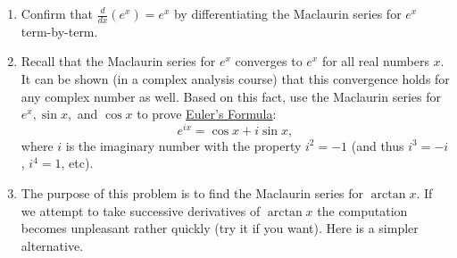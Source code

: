 \documentclass[12pt]{article}
\newif\ifans
\begin{document}
\begin{enumerate}

\item Confirm that $\frac{d}{dx}(e^x)=e^x$ by differentiating the Maclaurin series for $e^x$ term-by-term.

\ifans{\fbox{\parbox{1\linewidth}{\begin{align*} \frac{d}{dx}(e^x)&=\frac{d}{dx}\left[1+x+\frac{x^2}{2!}+\frac{x^3}{3!}+\frac{x^4}{4!}+\ldots \right] \\
&=0+1+\frac{2x}{2!}+\frac{3x^2}{3!}+\frac{4x^3}{4!}+\ldots \\
&=1+x+\frac{x^2}{2!}+\frac{x^3}{3!}+\ldots \\
&=e^x. \end{align*}  }}} \fi

\item Recall that the Maclaurin series for $e^{x}$ converges to $e^{x}$ for all real numbers $x$.  It can be shown (in a complex analysis course) that this convergence holds for any complex number as well.  Based on this fact, use the Maclaurin
series for $e^x, \sin{x},$ and $\cos{x}$ to prove \underline{Euler's Formula}: $$e^{ix}=\cos{x}+i\sin{x},$$ where $i$ is the imaginary number with the property $i^2=-1$ (and thus $i^3=-i$, $i^4=1$, etc).

\ifans{\fbox{\parbox{1\linewidth}{Since $e^x=1+x+\frac{x^2}{2!}+\frac{x^3}{3!}+\ldots$ \text{ }, we have 
\begin{align*}  e^{ix}&=1+ix+\frac{(ix)^2}{2!}+\frac{(ix)^3}{3!}+\frac{(ix)^4}{4!}+\frac{(ix)^5}{5!}+\frac{(ix)^6}{6!}+\frac{(ix)^7}{7!}+\frac{(ix)^8}{8!}+\ldots
\\ &=1+ix-\frac{x^2}{2!}-i\frac{x^3}{3!}+\frac{x^4}{4!}+i\frac{x^5}{5!}-\frac{x^6}{6!}-i\frac{x^7}{7!}+\frac{x^8}{8!}+\ldots 
\\ &=\left(1-\frac{x^2}{2!}+\frac{x^4}{4!}-\frac{x^6}{6!}+\frac{x^8}{8!}+\ldots\right)+i\left(x-\frac{x^3}{3!}+\frac{x^5}{5!}-\frac{x^7}{7!}+\ldots\right)
\\ &=\cos{x}+i\sin{x} \end{align*} 
Note: Recall that Euler's formula was useful when solving second order linear homogeneous differential equations with constant coefficients, specifcally for when the characteristic equation had complex roots.}}} \fi


\item The purpose of this problem is to find the Maclaurin series for $\arctan{x}$.  If we attempt to take successive derivatives of $\arctan{x}$ the computation becomes unpleasant rather quickly (try it if you want).  Here is
a simpler alternative. 


\end{enumerate}
\end{document}
